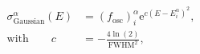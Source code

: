 \documentclass{article}
\newcommand{\E}{\ensuremath{\mathrm{e}}}
\begin{document}
\begin{align}
  \sigma_{\text{Gaussian}}^\alpha(E)&=
  \left(f_{\text{osc}}\right)_i^\alpha 
  \E^{c\left(E-E_i^\alpha\right)^2},\nonumber\\
  \text{with}\qquad
  c&=-\frac{4\ln(2)}{\text{FWHM}^2},
\nonumber\end{align}
\end{document}
